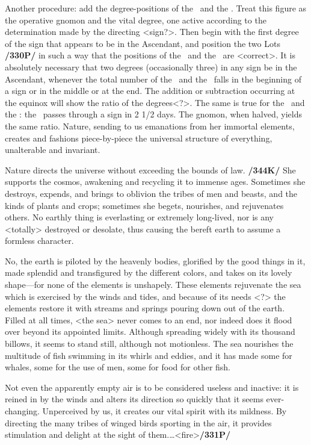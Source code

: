 Another procedure: add the degree-positions of the \Sun\, and the \Moon. Treat this figure as the operative gnomon and the vital degree, one active according to the determination made by the directing <sign?>. Then begin with the first degree of the sign that appears to be in the Ascendant, and position the two Lots \textbf{/330P/} in such a way that the positions of the \Sun\, and the \Moon\, are <correct>. It is absolutely necessary that two degrees (occasionally three) in any sign be in the Ascendant, whenever the total number
of the \Sun\, and the \Moon\, falls in the beginning of a sign or in the middle or at the end. The addition or subtraction occurring at the equinox will show the ratio of the degrees<?>. The same is true for the \Sun\, and the \Moon: the \Moon\, passes through a sign in 2 1/2 days. The gnomon, when halved, yields the same ratio. Nature, sending to us emanations from her immortal elements, creates and fashions piece-by-piece the universal structure of everything, unalterable and invariant. 

Nature directs the universe without exceeding the bounds of law. \textbf{/344K/} She supports the cosmos, awakening and recycling it to immense ages. Sometimes she destroys, expends, and brings to oblivion the tribes of men and beasts, and the kinds of plants and crops; sometimes she begets, nourishes, and rejuvenates others. No earthly thing is everlasting or extremely long-lived, nor is any <totally> destroyed or desolate, thus causing the bereft earth to assume a formless character. 

No, the earth is piloted by the heavenly bodies, glorified by the good things in it, made splendid and transfigured by the different colors, and takes on its lovely shape—for none of the elements is unshapely. These elements rejuvenate the sea which is exercised by the winds and tides, and because of its needs <?> the elements restore it with streams and springs pouring down out of the earth. Filled at all times, <the sea> never comes to an end, nor indeed does it flood over beyond its appointed limits. Although spreading widely with its thousand billows, it seems to stand still, although not motionless. The sea nourishes the multitude of fish swimming in its whirls and eddies, and it has made some for whales, some for the use of men, some for food for other fish.

Not even the apparently empty air is to be considered useless and inactive: it is reined in by the winds and alters its direction so quickly that it seems ever-changing. Unperceived by us, it creates our vital spirit with its mildness. By directing the many tribes of winged birds sporting in the air, it provides stimulation and delight at the sight of them.…<fire>\textbf{/331P/} 

